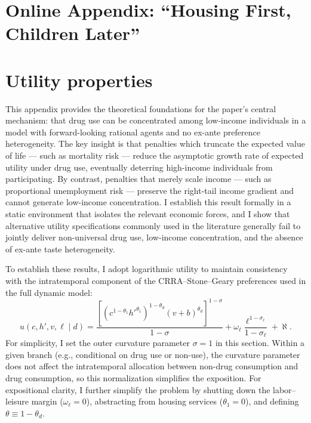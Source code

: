 \appendix
\setcounter{page}{1}
\setcounter{section}{0} %

\vspace{-3cm}
\section*{Online Appendix: ``Housing First, Children Later''}

\section{Utility properties}\label{app:proofs}

This appendix provides the theoretical foundations for the paper's central mechanism: that drug use can be concentrated among low-income individuals in a model with forward-looking rational agents and no ex-ante preference heterogeneity. The key insight is that penalties which truncate the expected value of life — such as mortality risk — reduce the asymptotic growth rate of expected utility under drug use, eventually deterring high-income individuals from participating. By contrast, penalties that merely scale income — such as proportional unemployment risk — preserve the right-tail income gradient and cannot generate low-income concentration. I establish this result formally in a static environment that isolates the relevant economic forces, and I show that alternative utility specifications commonly used in the literature generally fail to jointly deliver non-universal drug use, low-income concentration, and the absence of ex-ante taste heterogeneity.

To establish these results, I adopt logarithmic utility to maintain consistency with the intratemporal component of the CRRA--Stone--Geary preferences used in the full dynamic model:
\[
u\!\left(c,h',v,\ell \mid d\right)
=\frac{\left[(c^{1-\theta_1}h'^{\theta_1})^{1-\theta_{d}}(v+b)^{\theta_{d}}\right]^{1-\sigma}}{1-\sigma}
+\omega_\ell\frac{\ell^{1-\sigma_\ell}}{1-\sigma_\ell}+\aleph.
\]
For simplicity, I set the outer curvature parameter $\sigma=1$ in this section. Within a given branch (e.g., conditional on drug use or non-use), the curvature parameter does not affect the intratemporal allocation between non-drug consumption and drug consumption, so this normalization simplifies the exposition. For expositional clarity, I further simplify the problem by shutting down the labor--leisure margin ($\omega_\ell=0$), abstracting from housing services ($\theta_1=0$), and defining $\theta\equiv 1-\theta_d$.

